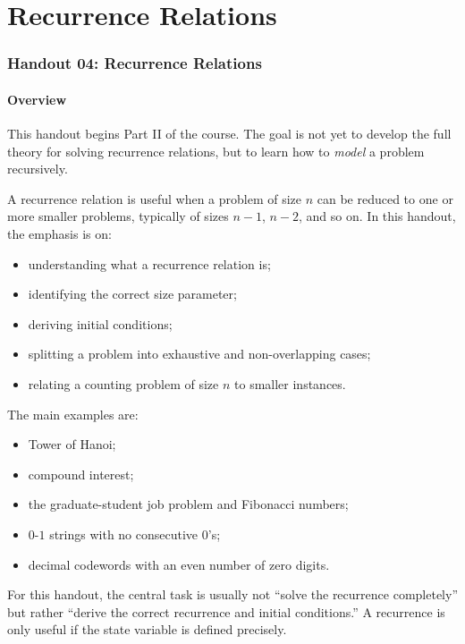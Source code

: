 \part{Recurrence Relations}
\section{Handout 04: Recurrence Relations}

\subsection{Overview}

This handout begins Part II of the course. The goal is not yet to develop the full theory for solving recurrence relations, but to learn how to \emph{model} a problem recursively.

A recurrence relation is useful when a problem of size $n$ can be reduced to one or more smaller problems, typically of sizes $n-1$, $n-2$, and so on. In this handout, the emphasis is on:
\begin{itemize}[leftmargin=*]
    \item understanding what a recurrence relation is;
    \item identifying the correct size parameter;
    \item deriving initial conditions;
    \item splitting a problem into exhaustive and non-overlapping cases;
    \item relating a counting problem of size $n$ to smaller instances.
\end{itemize}

The main examples are:
\begin{itemize}[leftmargin=*]
    \item Tower of Hanoi;
    \item compound interest;
    \item the graduate-student job problem and Fibonacci numbers;
    \item $0$-$1$ strings with no consecutive $0$'s;
    \item decimal codewords with an even number of zero digits.
\end{itemize}

\begin{examtip}[title={Main objective of Handout 04}]
For this handout, the central task is usually not ``solve the recurrence completely'' but rather ``derive the correct recurrence and initial conditions.'' A recurrence is only useful if the state variable is defined precisely.
\end{examtip}

